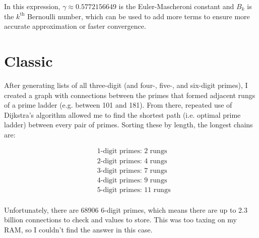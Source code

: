 \documentclass[11pt]{article} %
\begin{document}
In this expression, $\gamma \approx 0.5772156649$ is the Euler-Mascheroni constant and $B_k$ is the $k^{\text{th}}$ Bernoulli number, which can be used to add more terms to ensure more accurate approximation or faster convergence.

\section{Classic}

After generating lists of all three-digit (and four-, five-, and six-digit primes), I created a graph with connections between
the primes that formed adjacent rungs of a prime ladder (e.g. between 101 and 181). From there, repeated use of Dijkstra's
algorithm allowed me to find the shortest path (i.e. optimal prime ladder) between every pair of primes. Sorting these by
length, the longest chains are:

\begin{align*}
& \text{1-digit primes: 2 rungs} \\
& \text{2-digit primes: 4 rungs} \\
& \text{3-digit primes: 7 rungs} \\
& \text{4-digit primes: 9 rungs} \\
& \text{5-digit primes: 11 rungs} \\
\end{align*}

Unfortunately, there are 68906 6-digit primes, which means there are up to 2.3 billion connections to check and values
to store. This was too taxing on my RAM, so I couldn't find the answer in this case.
\end{document}

